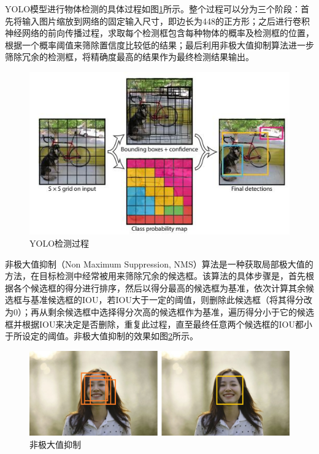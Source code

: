 YOLO模型进行物体检测的具体过程如图\ref{fig:3_2_YOLO检测过程}所示。整个过程可以分为三个阶段：首先将输入图片缩放到网络的固定输入尺寸，即边长为448的正方形；之后进行卷积神经网络的前向传播过程，求取每个检测框包含每种物体的概率及检测框的位置，根据一个概率阈值来筛除置信度比较低的结果；最后利用非极大值抑制算法进一步筛除冗余的检测框，将精确度最高的结果作为最终检测结果输出。

\begin{figure}[htb] %
	\centering
	\includegraphics[width=5in]{figures/3_2_YOLO检测过程}
	\caption{YOLO检测过程} \label{fig:3_2_YOLO检测过程}
\end{figure}

非极大值抑制（Non Maximum Suppression, NMS）算法是一种获取局部极大值的方法，在目标检测中经常被用来筛除冗余的候选框。该算法的具体步骤是，首先根据各个候选框的得分进行排序，然后以得分最高的候选框为基准，依次计算其余候选框与基准候选框的IOU，若IOU大于一定的阈值，则删除此候选框（将其得分改为0）；再从剩余候选框中选择得分次高的候选框作为基准，遍历得分小于它的候选框并根据IOU来决定是否删除，重复此过程，直至最终任意两个候选框的IOU都小于所设定的阈值。非极大值抑制的效果如图\ref{fig:3_2_NMS}所示。

\begin{figure}[htb] %
	\centering
	\includegraphics[width=5in]{figures/3_2_NMS}
	\caption{非极大值抑制} \label{fig:3_2_NMS}
\end{figure}

